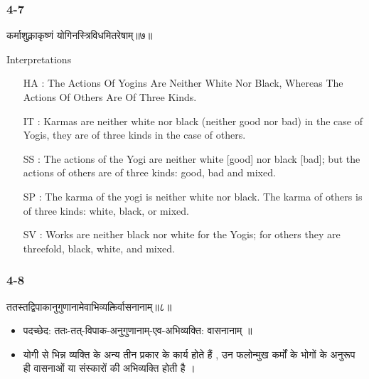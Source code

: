 \begin{frame}[fragile]\frametitle{4-7}
\begin{sanskrit}
कर्माशुक्लाकृष्णं योगिनस्त्रिविधमितरेषाम्॥७॥
\end{sanskrit}

Interpretations
\begin{itemize}	
\item [HA]: The Actions Of Yogins Are Neither White Nor Black, Whereas The Actions Of Others Are Of Three Kinds.
\item [IT]: Karmas are neither white nor black (neither good nor bad) in the case of Yogis, they are of three kinds in the case of others.
\item [SS]: The actions of the Yogi are neither white [good] nor black [bad]; but the actions of others are of three kinds: good, bad and mixed.
\item [SP]: The karma of the yogi is neither white nor black. The karma of others is of three kinds: white, black, or mixed.
\item [SV]: Works are neither black nor white for the Yogis; for others they are threefold, black, white, and mixed.
\end{itemize}
\end{frame}

\begin{frame}[fragile]\frametitle{4-8}
\begin{sanskrit}
ततस्तद्विपाकानुगुणानामेवाभिव्यक्तिर्वासनानाम्॥८॥
\end{sanskrit}

\begin{itemize}
\item पदच्छेद:  ततः-तत्-विपाक-अनुगुणानाम्-एव-अभिव्यक्ति: वासनानाम् ॥
\item  योगी से भिन्न व्यक्ति के अन्य तीन प्रकार के कार्य होते हैं , उन फलोन्मुख कर्मों के भोगों के अनुरूप ही वासनाओं या संस्कारों की अभिव्यक्ति होती है ।
\end{itemize}
\end{frame}


